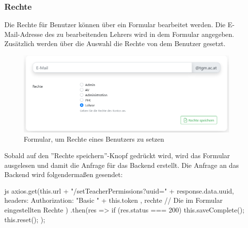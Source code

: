 \subsubsection{Rechte}
Die Rechte für Benutzer können über ein Formular bearbeitet werden. Die E-Mail-Adresse des zu bearbeitenden Lehrers wird in dem Formular angegeben. Zusätzlich werden über die Auswahl die Rechte von dem Benutzer gesetzt.
\begin{figure}[H]
	\centering
	\includegraphics[width=1\linewidth]{images/rights}
	\caption[Formular der Rechte]{Formular, um Rechte eines Benutzers zu setzen}
	\label{fig:rightsform}
\end{figure}
Sobald auf den ''Rechte speichern''-Knopf gedrückt wird, wird das Formular ausgelesen und damit die Anfrage für das Backend erstellt. Die Anfrage an das Backend wird folgendermaßen gesendet:
\begin{code}{js}
	axios.get(this.url + "/setTeacherPermissions?uuid=" + response.data.uuid,
	{
		headers: {
			Authorization: "Basic " + this.token
		}
	}, rechte	// Die im Formular eingestellten Rechte
	)
	.then(res => {
		if (res.status === 200) {
			this.saveComplete();
			this.reset();
		}
	});
\end{code}
~\\